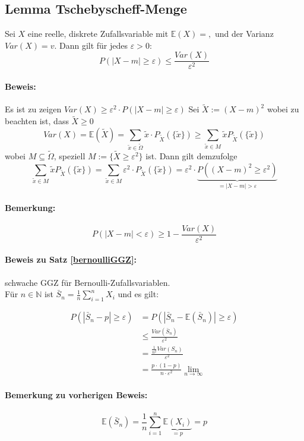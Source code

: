 \documentclass[12pt,a4paper]{article}
\begin{document}
	\subsection{Lemma Tschebyscheff-Menge}
	Sei $X$ eine reelle, diskrete Zufallsvariable mit $\mathbb{E}(X)=,$ und der Varianz $Var(X)=v$. Dann gilt für jedes $\varepsilon >0$:
	$$P\left(|X-m|\geq\varepsilon\right)\leq\frac{Var(X)}{\varepsilon^2}$$
	\paragraph{Beweis:}
	Es ist zu zeigen $Var(X)\geq\varepsilon^2\cdot P(|X-m|\geq\varepsilon)$
	Sei $\tilde{X}:=(X-m)^2$ wobei zu beachten ist, dass $\tilde{X}\geq 0$
	$$Var(X)=\mathbb{E}(\tilde{X})=\sum_{\tilde{x}\in\tilde{\Omega}}\tilde{x} \cdot 
P_{\tilde{X}}(\{\tilde{x}\})\geq\sum_{\tilde{x}\in M} \tilde{x}P_{\tilde{X}}(\{\tilde{x}\})$$
	wobei $M\subseteq\tilde{\Omega}$, speziell $M:=\{\tilde{X}\geq\varepsilon^2\}$ ist. Dann gilt demzufolge
	$$\sum_{\tilde{x}\in M} \tilde{x}P_{\tilde{X}}(\{\tilde{x}\})=\sum_{\tilde{x}\in M} \varepsilon^2 \cdot P_{\tilde{X}}(\{\tilde{x}\})=\varepsilon^2 \cdot \underbrace{P\left(\left(X-m\right)^2\geq\varepsilon^2\right)}_{=|X-m|>\varepsilon}$$
	\paragraph{Bemerkung:}
	$$P\left(\left| X-m\right| < \varepsilon\right)\geq 1-\frac{Var(X)}{\varepsilon^2}$$ 
	
	\paragraph{Beweis zu Satz \ref{bernoulliGGZ}:}
	schwache GGZ für Bernoulli-Zufallsvariablen.\\
	Für $n\in\mathbb{N}$ ist $\bar{S}_n = \frac{1}{n}\sum_{i=1}^n X_i$ und es gilt:

	\begin{align*}
	P\left(\left| \bar{S}_n -p\right|\geq\varepsilon\right) &= P\left(\left|\bar{S}_n -\mathbb{E}\left(\bar{S}_n\right)\right|\geq\varepsilon\right)\\
	&\leq \frac{Var(\bar{S}_n)}{\varepsilon^2}\\
	&= \frac{\frac{1}{n^2} Var(S_n)}{\varepsilon^2}\\
	&= \frac{p\cdot(1-p)}{n\cdot \varepsilon^2}\lim_{n\rightarrow\infty}
	\end{align*}		
	
	\paragraph{Bemerkung zu vorherigen Beweis:}
	$$\mathbb{E}\left(\bar{S}_n \right) = \frac{1}{n}\sum_{i=1}^n \underbrace{\mathbb{E}(X_i)}_{=p}=p$$
	
\end{document}
